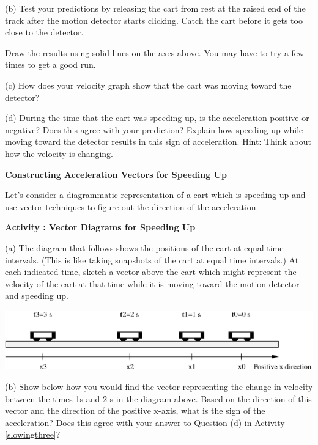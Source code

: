 (b) Test your predictions by releasing the cart from rest at the raised end of the track after the motion detector starts clicking. Catch the cart before it gets too close to the detector.

Draw the results using solid lines on the axes above. You may have to try a
few times to get a good run.

(c) How does your velocity graph show that the cart was moving toward the detector? 
\vspace{20mm}

(d) During the time that the cart was speeding up, is the acceleration positive
or negative? Does this agree with your prediction? Explain how speeding up while
moving toward the detector results in this sign of acceleration. Hint: Think
about how the velocity is changing.
\vspace{20mm}

\textbf{Constructing Acceleration Vectors for Speeding Up} 

Let's consider a diagrammatic representation of a cart which is speeding up
and use vector techniques to figure out the direction of the acceleration.

\vspace{10mm}

\textbf{Activity : Vector Diagrams for Speeding Up} 

(a) The diagram that follows shows the positions of the cart at equal time intervals.
(This is like taking snapshots of the cart at equal time intervals.) At each
indicated time, sketch a vector above the cart which might represent the velocity
of the cart at that time while it is moving toward the motion detector and speeding
up.

\vspace{0.3cm}
{\par\centering \includegraphics{slowing/slowing_fig3.eps} \par}
\vspace{0.3cm}

(b) Show below how you would find the vector representing the change in velocity
between the times 1s and 2 s in the diagram above. Based on the direction of
this vector and the direction of the positive x-axis, what is the sign of the
acceleration? Does this agree with your answer to Question (d) in Activity \ref{slowingthree}?
\vspace{20mm}

